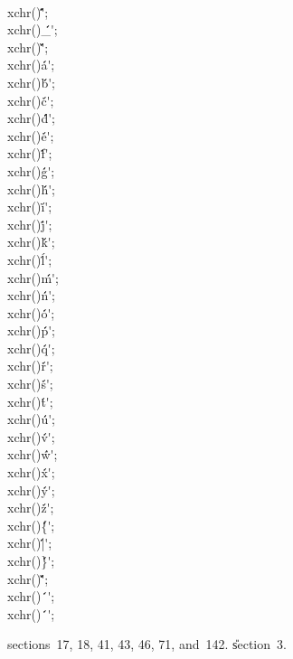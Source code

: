 \\{xchr}\?\1(\2)\K\?\.{\'\^\'};\5
\\{xchr}\?\1(\2)\K\?\.{\'\_\'};\6
\\{xchr}\?\1(\2)\K\?\.{\'\`\'};\5
\\{xchr}\?\1(\2)\K\?\.{\'a\'};\5
\\{xchr}\?\1(\2)\K\?\.{\'b\'};\5
\\{xchr}\?\1(\2)\K\?\.{\'c\'};\5
\\{xchr}\?\1(\2)\K\?\.{\'d\'};\5
\\{xchr}\?\1(\2)\K\?\.{\'e\'};\5
\\{xchr}\?\1(\2)\K\?\.{\'f\'};\5
\\{xchr}\?\1(\2)\K\?\.{\'g\'};\6
\\{xchr}\?\1(\2)\K\?\.{\'h\'};\5
\\{xchr}\?\1(\2)\K\?\.{\'i\'};\5
\\{xchr}\?\1(\2)\K\?\.{\'j\'};\5
\\{xchr}\?\1(\2)\K\?\.{\'k\'};\5
\\{xchr}\?\1(\2)\K\?\.{\'l\'};\5
\\{xchr}\?\1(\2)\K\?\.{\'m\'};\5
\\{xchr}\?\1(\2)\K\?\.{\'n\'};\5
\\{xchr}\?\1(\2)\K\?\.{\'o\'};\6
\\{xchr}\?\1(\2)\K\?\.{\'p\'};\5
\\{xchr}\?\1(\2)\K\?\.{\'q\'};\5
\\{xchr}\?\1(\2)\K\?\.{\'r\'};\5
\\{xchr}\?\1(\2)\K\?\.{\'s\'};\5
\\{xchr}\?\1(\2)\K\?\.{\'t\'};\5
\\{xchr}\?\1(\2)\K\?\.{\'u\'};\5
\\{xchr}\?\1(\2)\K\?\.{\'v\'};\5
\\{xchr}\?\1(\2)\K\?\.{\'w\'};\6
\\{xchr}\?\1(\2)\K\?\.{\'x\'};\5
\\{xchr}\?\1(\2)\K\?\.{\'y\'};\5
\\{xchr}\?\1(\2)\K\?\.{\'z\'};\5
\\{xchr}\?\1(\2)\K\?\.{\'\{\'};\5
\\{xchr}\?\1(\2)\K\?\.{\'|\'};\5
\\{xchr}\?\1(\2)\K\?\.{\'\}\'};\5
\\{xchr}\?\1(\2)\K\?\.{\'\~\'};\6
\\{xchr}\?\1(\?\2)\K\?\.{\'\ \'};\5
\\{xchr}\?\1(\2)\K\?\.{\'\ \'};\par
\A sections~17, 18, 41, 43, 46, 71, and~142.
\U section~3\*.\fi

